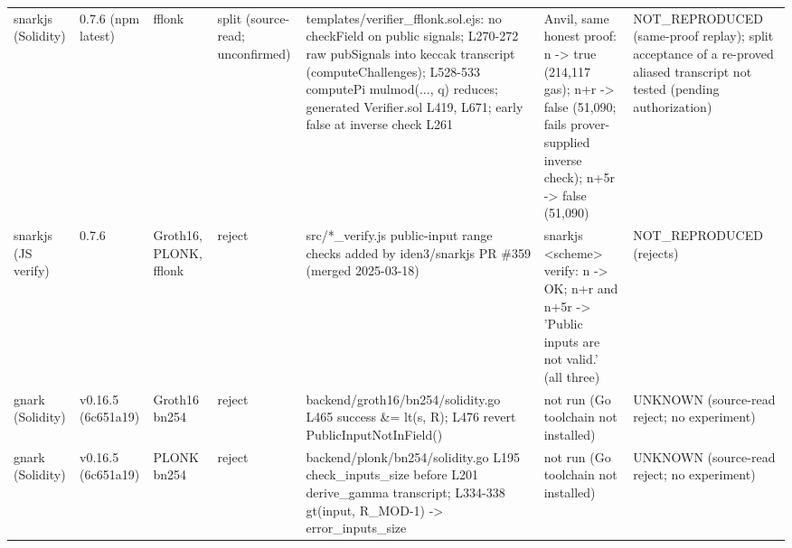 \begin{tabular}{lllllll}
snarkjs (Solidity) & 0.7.6 (npm latest) & fflonk & split (source-read; unconfirmed) & templates/verifier\_fflonk.sol.ejs: no checkField on public signals; L270-272 raw pubSignals into keccak transcript (computeChallenges); L528-533 computePi mulmod(..., q) reduces; generated Verifier.sol L419, L671; early false at inverse check L261 & Anvil, same honest proof: n -> true (214,117 gas); n+r -> false (51,090; fails prover-supplied inverse check); n+5r -> false (51,090) & NOT\_REPRODUCED (same-proof replay); split acceptance of a re-proved aliased transcript not tested (pending authorization) \\
snarkjs (JS verify) & 0.7.6 & Groth16, PLONK, fflonk & reject & src/*\_verify.js public-input range checks added by iden3/snarkjs PR \#359 (merged 2025-03-18) & snarkjs <scheme> verify: n -> OK; n+r and n+5r -> 'Public inputs are not valid.' (all three) & NOT\_REPRODUCED (rejects) \\
gnark (Solidity) & v0.16.5 (6c651a19) & Groth16 bn254 & reject & backend/groth16/bn254/solidity.go L465 success \&= lt(s, R); L476 revert PublicInputNotInField() & not run (Go toolchain not installed) & UNKNOWN (source-read reject; no experiment) \\
gnark (Solidity) & v0.16.5 (6c651a19) & PLONK bn254 & reject & backend/plonk/bn254/solidity.go L195 check\_inputs\_size before L201 derive\_gamma transcript; L334-338 gt(input, R\_MOD-1) -> error\_inputs\_size & not run (Go toolchain not installed) & UNKNOWN (source-read reject; no experiment) \\
\bottomrule
\end{tabular}
